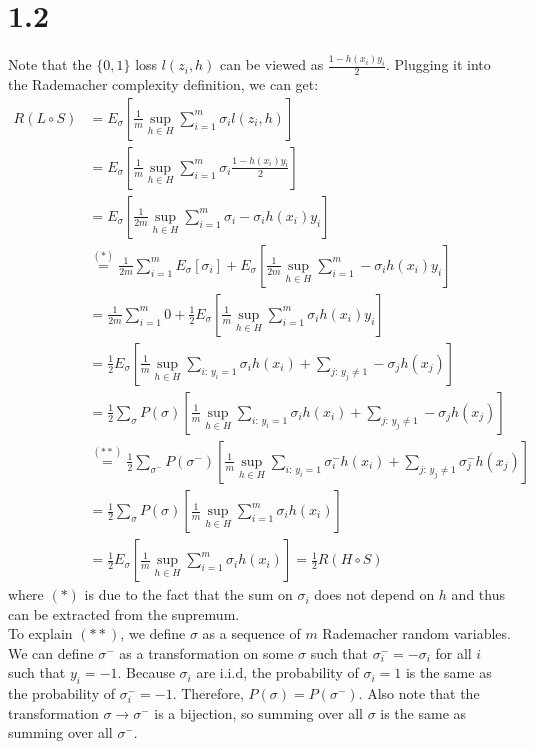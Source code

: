 \documentclass{article}
\begin{document}
\section*{1.2}
Note that the $\{0,1\}$ loss $l(z_i, h)$ can be viewed as $\frac{1-h(x_i)y_i}{2}$. Plugging it into the Rademacher complexity definition, we can get:
\begin{align*}
    R(L\circ S) &= E_\sigma \left[ \frac{1}{m}\sup_{h \in H}\sum_{i=1}^m \sigma_i l(z_i, h) \right] \\ &= E_\sigma \left[ \frac{1}{m}\sup_{h \in H}\sum_{i=1}^m \sigma_i \frac{1-h(x_i)y_i}{2} \right] \\ &= E_\sigma \left[ \frac{1}{2m}\sup_{h \in H}\sum_{i=1}^m \sigma_i - \sigma_i h(x_i)y_i \right] \\ 
    &\stackrel{(*)}{=} \frac{1}{2m}\sum_{i=1}^mE_\sigma\left[\sigma_i\right] + E_\sigma\left[\frac{1}{2m}\sup_{h\in H}\sum_{i=1}^m -\sigma_i h(x_i)y_i\right] \\
    &= \frac{1}{2m}\sum_{i=1}^m 0 + \frac{1}{2}E_\sigma\left[\frac{1}{m}\sup_{h\in H}\sum_{i=1}^m \sigma_i h(x_i)y_i\right] \\
    &= \frac{1}{2}E_\sigma\left[\frac{1}{m}\sup_{h\in H}\sum_{i: \, y_i=1} \sigma_i h(x_i) + \sum_{j: \, y_j\neq1} -\sigma_j h(x_j)\right] \\ 
    &= \frac{1}{2}\sum_{\sigma} P(\sigma)\left[ \frac{1}{m}\sup_{h\in H}\sum_{i: \, y_i=1} \sigma_i h(x_i) + \sum_{j: \, y_j\neq1} -\sigma_j h(x_j) \right] \\
    &\stackrel{(**)}{=} \frac{1}{2}\sum_{\sigma^-} P(\sigma^-)\left[ \frac{1}{m}\sup_{h\in H}\sum_{i: \, y_i=1} \sigma^-_i h(x_i) + \sum_{j: \, y_j\neq1} \sigma^-_j h(x_j) \right] \\
    &= \frac{1}{2}\sum_{\sigma} P(\sigma)\left[\frac{1}{m}\sup_{h\in H}\sum_{i=1}^m \sigma_i h(x_i)\right] \\
    &= \frac{1}{2}E_\sigma\left[\frac{1}{m}\sup_{h\in H}\sum_{i=1}^m \sigma_i h(x_i)\right] = \frac{1}{2}R(H \circ S)
\end{align*}
where $(*)$ is due to the fact that the sum on $\sigma_i$ does not depend on $h$ and thus can be extracted from the supremum.\\
To explain $(**)$, we define $\sigma$ as a sequence of $m$ Rademacher random variables. We can define $\sigma^-$ as
a transformation on some $\sigma$ such that $\sigma^-_i = -\sigma_i$ for all $i$ such that $y_i = -1$. Because $\sigma_i$
are i.i.d, the probability of $\sigma_i = 1$ is the same as the probability of $\sigma^-_i = -1$. Therefore, $P(\sigma) = P(\sigma^-)$.
Also note that the transformation $\sigma \rightarrow \sigma^-$ is a bijection, so summing over all $\sigma$ is the same as summing over all $\sigma^-$.\\
\end{document}
